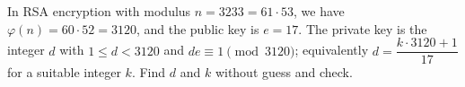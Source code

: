 In RSA encryption with modulus $n=3233=61\cdot53$, we have $\varphi(n)=60\cdot52=3120$, and the public key is $e=17$. The private key is the integer $d$ with $1\le d<3120$ and $de\equiv1\pmod{3120}$; equivalently $d=\dfrac{k\cdot3120+1}{17}$ for a suitable integer $k$. Find $d$ and $k$ without guess and check.
